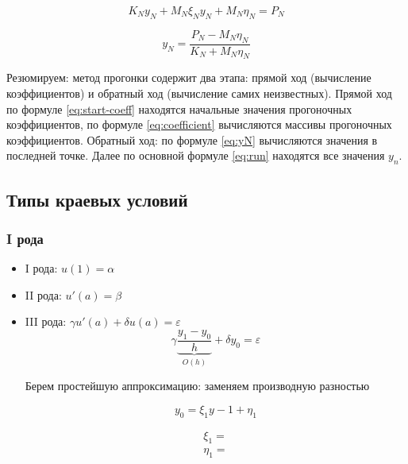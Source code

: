 \begin{equation*}
    K_N y_N + M_N \xi_N y_N + M_N \eta_N = P_N
\end{equation*}

\begin{equation}\label{eq:yN}
    y_N = \frac{P_N - M_N \eta_N}{K_N + M_N \eta_N}
\end{equation}

Резюмируем: метод прогонки содержит два этапа: прямой ход
(вычисление коэффициентов) и обратный ход
(вычисление самих неизвестных).
Прямой ход по формуле \ref{eq:start-coeff} находятся начальные значения
прогоночных коэффициентов, по формуле \ref{eq:coefficient}
вычисляются массивы прогоночных коэффициентов. Обратный ход:
по формуле \ref{eq:yN} вычисляются значения в последней точке.
Далее по основной формуле \ref{eq:run} находятся все значения $y_n$.

\subsection{Типы краевых условий}

\subsubsection{I рода}

\begin{itemize}
    \item I рода: $u(1) = \alpha$
    \item II рода: $u'(a) = \beta$
    \item III рода: $\gamma u'(a) + \delta u(a) = \varepsilon$
        \begin{equation*}
            \gamma \underbrace{\frac{y_1 - y_0}{h}}_{O(h)}
            + \delta y_0 = \varepsilon
        \end{equation*}

        Берем простейшую аппроксимацию: заменяем производную разностью

        \begin{equation*}
            y_0 = \xi_1 y-1 + \eta_1
        \end{equation*}

        \begin{equation*}
            \begin{matrix}
                \xi_1 = \\
                \eta_1 = \\
            \end{matrix}
        \end{equation*}
\end{itemize}
